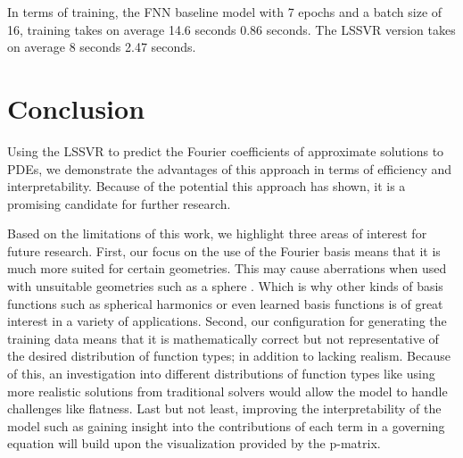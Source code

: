 \documentclass[preprint,12pt,times,authoryear]{elsarticle}
\begin{document}
In terms of training, the FNN baseline model with 7 epochs and a batch size of 16, training takes on average 14.6 seconds \pm{} 0.86 seconds. The LSSVR version takes on average 8 seconds \pm{} 2.47 seconds.

\section{Conclusion}
\noindent Using the LSSVR to predict the Fourier coefficients of approximate solutions to PDEs, we demonstrate the advantages of this approach in terms of efficiency and interpretability. Because of the potential this approach has shown, it is a promising candidate for further research. 

Based on the limitations of this work, we highlight three areas of interest for future research. First, our focus on the use of the Fourier basis means that it is much more suited for certain geometries. This may cause aberrations when used with unsuitable geometries such as a sphere \citep{bonevSphericalFourierNeural2023}. Which is why other kinds of basis functions such as spherical harmonics or even learned basis functions is of great interest in a variety of applications. Second, our configuration for generating the training data means that it is mathematically correct \citep{roacheCodeVerificationMethod2002,salariCodeVerificationMethod2000,vedovotoApplicationMethodManufactured2011} but not representative of the desired distribution of function types; in addition to lacking realism. Because of this, an investigation into different distributions of function types like using more realistic solutions from traditional solvers would allow the model to handle challenges like flatness. Last but not least, improving the interpretability of the model such as gaining insight into the contributions of each term in a governing equation will build upon the visualization provided by the p-matrix.





\end{document}
